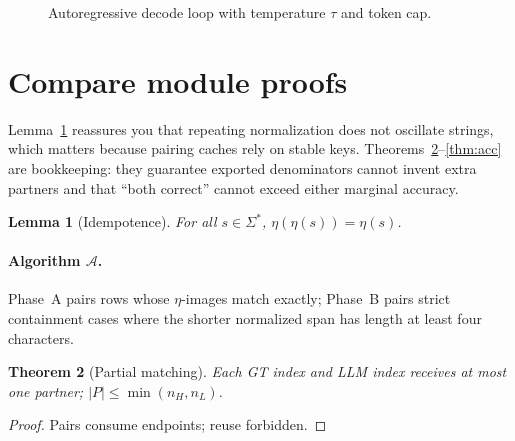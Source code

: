 \documentclass[11pt,a4paper]{article}
\newtheorem{theorem}{Theorem}[section]
\newtheorem{lemma}[theorem]{Lemma}
\theoremstyle{remark}
\newcommand{\Sig}{\Sigma^\ast}
\begin{document}
\begin{figure}[htbp]
\centering
{}
\caption{Autoregressive decode loop with temperature $\tau$ and token cap.}
\label{fig:l7c}
\end{figure}

\section{Compare module proofs}
\label{app:compare}

Lemma~\ref{lem:eta} reassures you that repeating normalization does not oscillate strings, which matters because pairing caches rely on stable keys. Theorems~\ref{thm:partial}--\ref{thm:acc} are bookkeeping: they guarantee exported denominators cannot invent extra partners and that ``both correct'' cannot exceed either marginal accuracy.

\begin{lemma}[Idempotence]
\label{lem:eta}
For all $s\in\Sig$, $\eta(\eta(s))=\eta(s)$.
\end{lemma}

\paragraph{Algorithm $\mathcal{A}$.}
Phase~A pairs rows whose $\eta$-images match exactly; Phase~B pairs strict containment cases where the shorter normalized span has length at least four characters.

\begin{theorem}[Partial matching]
\label{thm:partial}
Each GT index and LLM index receives at most one partner; $|P|\le\min(n_H,n_L)$.
\end{theorem}
\begin{proof}
Pairs consume endpoints; reuse forbidden.
\end{proof}
\end{document}
